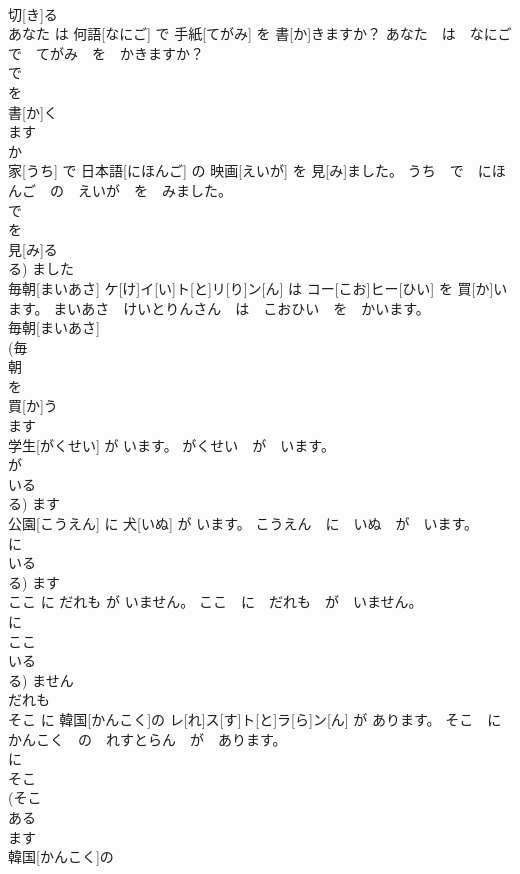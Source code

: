 \documentclass[8pt]{extreport}
\begin{document}
\begin{CJK}{UTF8}{min}
\\	切[き]る 
\\	あなた は 何語[なにご] で 手紙[てがみ] を 書[か]きますか？	あなた　は　なにご　で　てがみ　を　かきますか？	
\\	で 
\\	を 
\\	書[か]く 
\\	ます 
\\	か 
\\	家[うち] で 日本語[にほんご] の 映画[えいが] を 見[み]ました。	うち　で　にほんご　の　えいが　を　みました。	
\\	で 
\\	を 
\\	見[み]る 
\\	る)	ました 
\\	毎朝[まいあさ] ケ[け]イ[い]ト[と]リ[り]ン[ん] は コー[こお]ヒー[ひい] を 買[か]います。	まいあさ　けいとりんさん　は　こおひい　を　かいます。	
\\	毎朝[まいあさ] 
\\	(毎 
\\	朝 
\\	を 
\\	買[か]う 
\\	ます 
\\	学生[がくせい] が います。	がくせい　が　います。	
\\	が 
\\	いる 
\\	る)	ます 
\\	公園[こうえん] に 犬[いぬ] が います。	こうえん　に　いぬ　が　います。	
\\	に 
\\	いる 
\\	る)	ます 
\\	ここ に だれも が いません。	ここ　に　だれも　が　いません。	
\\	に 
\\	ここ 
\\	いる 
\\	る)	ません 
\\	だれも 
\\	そこ に 韓国[かんこく]の レ[れ]ス[す]ト[と]ラ[ら]ン[ん] が あります。	そこ　に　かんこく　の　れすとらん　が　あります。	
\\	に 
\\	そこ 
\\	(そこ 
\\	ある 
\\	ます 
\\	韓国[かんこく]の 

\end{CJK}
\end{document}
